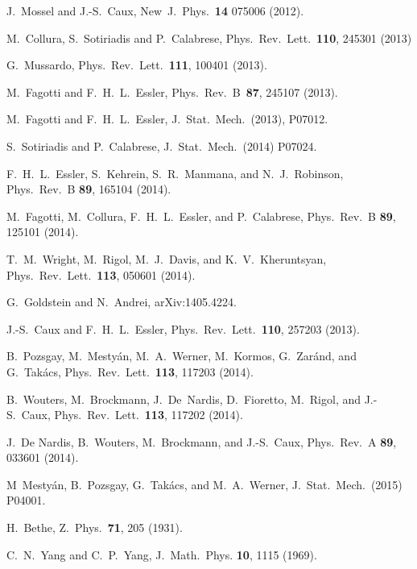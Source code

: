 \documentclass[twocolumn,superscriptaddress,prb,10pt]{revtex4-1}
\begin{document}
\begin{thebibliography}{99}
J.~Mossel and J.-S.~Caux, New\ J.\ Phys.\ {\bf 14} 075006 (2012).

M.~Collura, S.~Sotiriadis and P.~Calabrese, Phys.\ Rev.\ Lett.\ {\bf 110}, 245301 (2013)

G.~Mussardo, Phys.\ Rev.\ Lett.\ {\bf 111}, 100401 (2013).

M.~Fagotti and F.~H.~L.~Essler, Phys.\ Rev.\ B\ {\bf87}, 245107 (2013).

M.~Fagotti and F.~H.~L.~Essler, J.\ Stat.\ Mech.\ (2013), P07012. 

S.~Sotiriadis and P.~Calabrese, J.\ Stat.\ Mech.\ (2014) P07024. 

F.~H.~L.~Essler, S.~Kehrein, S.~R.~Manmana, and N.~J.~Robinson, Phys.\ Rev.\ B {\bf 89}, 
165104 (2014).

M.~Fagotti, M.~Collura, F.~H.~L.~Essler, and P.~Calabrese, Phys.\ Rev.\ B {\bf 89}, 
125101 (2014).

T.~M.~Wright, M.~Rigol, M.~J.~Davis, and K.~V.~Kheruntsyan, Phys.\ Rev.\ Lett.\ {\bf 113}, 
050601 (2014).

G.~Goldstein and N.~Andrei, arXiv:1405.4224. 



J.-S.~Caux and F.~H.~L.~Essler, Phys.\ Rev.\ Lett.\ {\bf 110}, 
257203 (2013). 

B.~Pozsgay, M.~Mesty\'an, M.~A.~Werner, M.~Kormos, G.~Zar\'and, and G.~Tak\'acs,
Phys.\ Rev.\ Lett.\ {\bf 113}, 117203 (2014). 

B.~Wouters, M.~Brockmann, J.~De~Nardis, D.~Fioretto, M.~Rigol, and J.-S.~Caux, 
Phys.\ Rev.\ Lett.\ {\bf 113}, 117202 (2014). 

J.~De Nardis, B.~Wouters, M.~Brockmann, and J.-S.~Caux, Phys.\ Rev.\ A {\bf 89}, 
033601 (2014). 

M~Mesty\'an, B.~Pozsgay, G.~Tak\'acs, and M.~A.~Werner, J.\ Stat.\ Mech.\ (2015) 
P04001.


H.~Bethe, Z.\ Phys.\ {\bf 71}, 205 (1931). 

C.~N.~Yang and C.~P.~Yang, J.\ Math.\ Phys. {\bf 10}, 1115 (1969).


\end{thebibliography}
\end{document}
